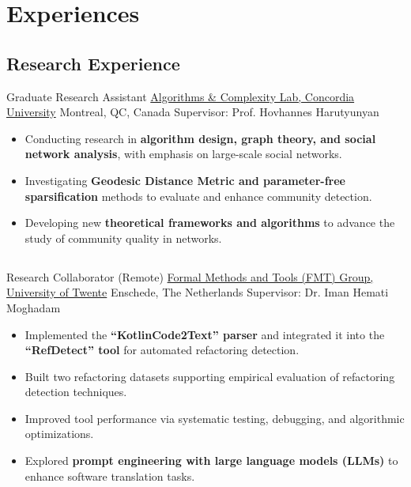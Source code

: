 \documentclass[10pt,a4paper,sans]{moderncv}        %
\begin{document}
\section{Experiences}
	\subsection{Research Experience}

  {Graduate Research Assistant}
  {\href{https://www.concordia.ca/ginacody/computer-science-software-eng.html}{Algorithms \& Complexity Lab, Concordia University}}
  {Montreal, QC, Canada}
  {Supervisor: Prof. Hovhannes Harutyunyan}
  {\begin{itemize}%
	\item Conducting research in \textbf{algorithm design, graph theory, and social network analysis}, with emphasis on large-scale social networks.  
    \item Investigating \textbf{Geodesic Distance Metric and parameter-free sparsification} methods to evaluate and enhance community detection.  
    \item Developing new \textbf{theoretical frameworks and algorithms} to advance the study of community quality in networks.  
  \end{itemize}}

\vspace*{-3mm}
\subsection{}

  {Research Collaborator (Remote)}
  {\href{https://www.utwente.nl/en/}{Formal Methods and Tools (FMT) Group, University of Twente}}
  {Enschede, The Netherlands}
  {Supervisor: Dr. Iman Hemati Moghadam}
  {\begin{itemize}%
    \item Implemented the \textbf{“KotlinCode2Text” parser} and integrated it into the \textbf{“RefDetect” tool} for automated refactoring detection.
    \item Built two refactoring datasets supporting empirical evaluation of refactoring detection techniques.
    \item Improved tool performance via systematic testing, debugging, and algorithmic optimizations.
    \item Explored \textbf{prompt engineering with large language models (LLMs)} to enhance software translation tasks.
  \end{itemize}}
\end{document}
